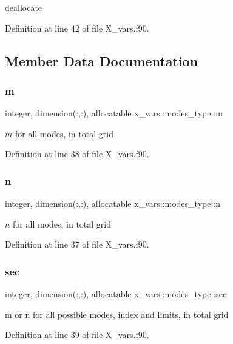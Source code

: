 deallocate 



Definition at line 42 of file X\+\_\+vars.\+f90.



\subsection{Member Data Documentation}
\mbox{\label{structx__vars_1_1modes__type_a75bcb0fb494d2e896553502ab67499ff}} 
\subsubsection{\texorpdfstring{m}{m}}
{\footnotesize\ttfamily integer, dimension(\+:,\+:), allocatable x\+\_\+vars\+::modes\+\_\+type\+::m}



$m$ for all modes, in total grid 



Definition at line 38 of file X\+\_\+vars.\+f90.

\mbox{\label{structx__vars_1_1modes__type_ab6d49ba52a26dd5d76685cc605e16ec0}} 
\subsubsection{\texorpdfstring{n}{n}}
{\footnotesize\ttfamily integer, dimension(\+:,\+:), allocatable x\+\_\+vars\+::modes\+\_\+type\+::n}



$n$ for all modes, in total grid 



Definition at line 37 of file X\+\_\+vars.\+f90.

\mbox{\label{structx__vars_1_1modes__type_acf880c5c3f78457cd4d40a3adf410eb7}} 
\subsubsection{\texorpdfstring{sec}{sec}}
{\footnotesize\ttfamily integer, dimension(\+:,\+:), allocatable x\+\_\+vars\+::modes\+\_\+type\+::sec}



{\ttfamily m} or {\ttfamily n} for all possible modes, index and limits, in total grid 



Definition at line 39 of file X\+\_\+vars.\+f90.




